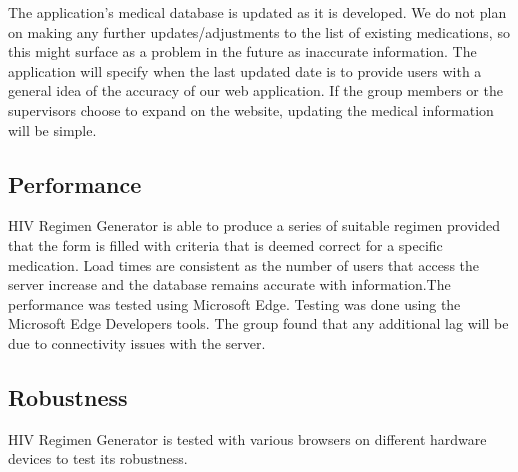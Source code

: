 \documentclass[12pt]{article}
\begin{document}
The application’s medical database is updated as it is developed. We do not plan on making any further updates/adjustments to the list of existing medications, so this might surface as a problem in the future as inaccurate information. The application will specify when the last updated date is to provide users with a general idea of the accuracy of our web application. If the group members or the supervisors choose to expand on the website, updating the medical information will be simple.

\subsection{Performance}
HIV Regimen Generator is able to produce a series of suitable regimen provided that the form is filled with criteria that is deemed correct for a specific medication. Load times are consistent as the number of users that access the server increase and the database remains accurate with information.The performance was tested using Microsoft Edge. Testing was done using the Microsoft Edge Developers tools. The group found that any additional lag will be due to connectivity issues with the server.

\subsection{Robustness}
HIV Regimen Generator is tested with various browsers on different hardware devices to test its robustness.
\end{document}
